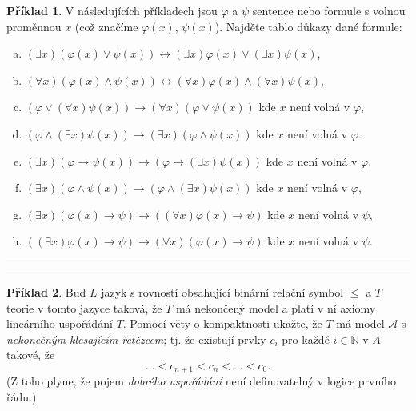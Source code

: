 \documentclass{amsart}
\theoremstyle{definition}
\newtheorem{problem}{Příklad}
\theoremstyle{remark}
\begin{document}
\medskip

\begin{problem} V následujících příkladech jsou $\varphi$ a $\psi$ sentence nebo formule s volnou proměnnou $x$ (což značíme $\varphi(x)$, $\psi(x)$). Najděte tablo důkazy dané formule:
\begin{enumerate}[(a)]
\itemsep6pt
\item $(\exists x)(\varphi(x)\vee \psi(x))\leftrightarrow (\exists x)\varphi(x)\vee (\exists x)\psi(x)$,
\item $(\forall x)(\varphi(x)\wedge\psi(x))\leftrightarrow (\forall x)\varphi(x)\wedge(\forall x)\psi(x)$,
\item $(\varphi \vee (\forall x)\psi(x))\to (\forall x)(\varphi \vee \psi(x))$ kde $x$ není volná v $\varphi$,
\item $(\varphi \wedge (\exists x)\psi(x))\to (\exists x)(\varphi \wedge \psi(x))$ kde $x$ není volná v $\varphi$.
\item $(\exists x)(\varphi \to \psi(x))\to(\varphi \to (\exists x)\psi(x))$ kde $x$ není volná v $\varphi$,
\item $(\exists x)(\varphi \wedge \psi(x))\to(\varphi \wedge (\exists x)\psi(x))$ kde $x$ není volná v $\varphi$,
\item $(\exists x)(\varphi(x)\to\psi)\to((\forall x)\varphi(x)\to \psi)$ kde $x$ není volná v $\psi$,
\item $((\exists x)\varphi(x)\to\psi)\to(\forall x)(\varphi(x)\to \psi)$ kde $x$ není volná v $\psi$.
\end{enumerate}
\end{problem} 

\medskip
\hrule



\medskip
\hrule

\begin{problem} Buď $L$ jazyk s rovností obsahující binární relační symbol $\le$ a $T$ teorie v tomto jazyce taková, že $T$ má nekončený model a platí v ní axiomy lineárního uspořádání $T$. Pomocí věty o kompaktnosti ukažte, že $T$ má model $\mathcal{A}$ s \emph{nekonečným klesajícím řetězcem}; tj. že existují prvky $c_i$ pro každé $i\in \mathbb{N}$ v $A$ takové, že 
    $$\dots < c_{n+1} < c_n< \dots <c_0.$$
    (Z toho plyne, že pojem \emph{dobrého uspořádání} není definovatelný v logice prvního řádu.)
\end{problem}
\end{document}
